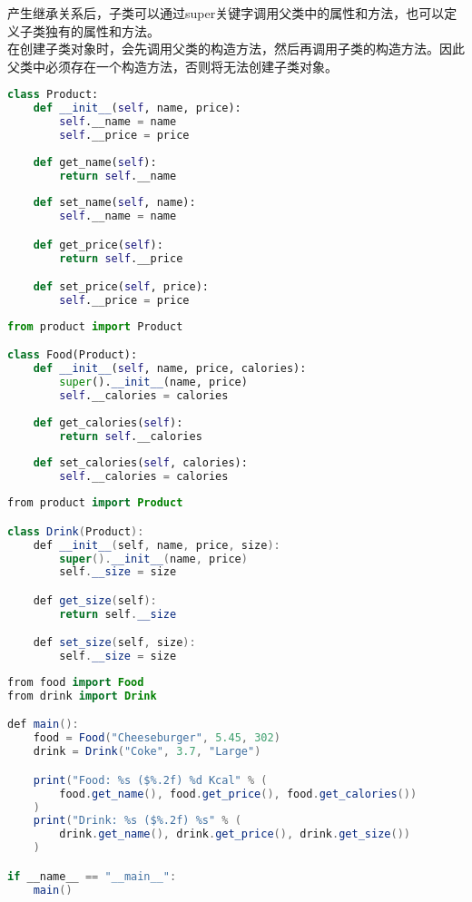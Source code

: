 产生继承关系后，子类可以通过super关键字调用父类中的属性和方法，也可以定义子类独有的属性和方法。\\

在创建子类对象时，会先调用父类的构造方法，然后再调用子类的构造方法。因此父类中必须存在一个构造方法，否则将无法创建子类对象。\\


\begin{lstlisting}[language=Python]
class Product:
    def __init__(self, name, price):
        self.__name = name
        self.__price = price
    
    def get_name(self):
        return self.__name
    
    def set_name(self, name):
        self.__name = name

    def get_price(self):
        return self.__price

    def set_price(self, price):
        self.__price = price
\end{lstlisting}

\begin{lstlisting}[language=Python]
from product import Product

class Food(Product):
    def __init__(self, name, price, calories):
        super().__init__(name, price)
        self.__calories = calories
    
    def get_calories(self):
        return self.__calories
    
    def set_calories(self, calories):
        self.__calories = calories
\end{lstlisting}

\begin{lstlisting}[language=Java]
from product import Product

class Drink(Product):
    def __init__(self, name, price, size):
        super().__init__(name, price)
        self.__size = size

    def get_size(self):
        return self.__size

    def set_size(self, size):
        self.__size = size
\end{lstlisting}

\begin{lstlisting}[language=Java]
from food import Food
from drink import Drink

def main():
    food = Food("Cheeseburger", 5.45, 302)
    drink = Drink("Coke", 3.7, "Large")

    print("Food: %s ($%.2f) %d Kcal" % (
        food.get_name(), food.get_price(), food.get_calories())
    )
    print("Drink: %s ($%.2f) %s" % (
        drink.get_name(), drink.get_price(), drink.get_size())
    )

if __name__ == "__main__":
    main()
\end{lstlisting}

